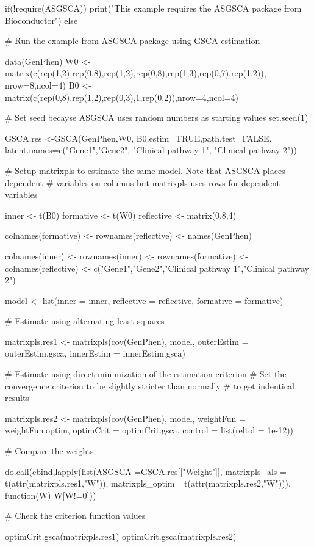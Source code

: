 \documentclass[a4paper]{book}
\begin{document}
%
\begin{Examples}
\begin{ExampleCode}
if(!require(ASGSCA)){
    print("This example requires the ASGSCA package from Bioconductor")
} else{
# Run the example from ASGSCA package using GSCA estimation

data(GenPhen)
W0 <- matrix(c(rep(1,2),rep(0,8),rep(1,2),rep(0,8),rep(1,3),rep(0,7),rep(1,2)),
             nrow=8,ncol=4)
B0 <- matrix(c(rep(0,8),rep(1,2),rep(0,3),1,rep(0,2)),nrow=4,ncol=4)

# Set seed becayse ASGSCA uses random numbers as starting values 
set.seed(1)

GSCA.res <-GSCA(GenPhen,W0, B0,estim=TRUE,path.test=FALSE, 
                 latent.names=c("Gene1","Gene2",
                                "Clinical pathway 1",
                                "Clinical pathway 2"))

# Setup matrixpls to estimate the same model. Note that ASGSCA places dependent
# variables on columns but matrixpls uses rows for dependent variables

inner <- t(B0)
formative <- t(W0)
reflective <- matrix(0,8,4)

colnames(formative) <- rownames(reflective) <- names(GenPhen)

colnames(inner) <- rownames(inner) <- 
  rownames(formative) <- colnames(reflective) <-
  c("Gene1","Gene2","Clinical pathway 1","Clinical pathway 2")

model <- list(inner = inner, 
              reflective = reflective,
              formative = formative)

# Estimate using alternating least squares

matrixpls.res1 <- matrixpls(cov(GenPhen),  model,
                            outerEstim = outerEstim.gsca,
                            innerEstim = innerEstim.gsca)

# Estimate using direct minimization of the estimation criterion
# Set the convergence criterion to be slightly stricter than normally
# to get indentical results

matrixpls.res2 <- matrixpls(cov(GenPhen),  model,
                            weightFun = weightFun.optim,
                            optimCrit = optimCrit.gsca,
                            control = list(reltol = 1e-12))

# Compare the weights

do.call(cbind,lapply(list(ASGSCA =GSCA.res[["Weight"]],
                          matrixpls_als = t(attr(matrixpls.res1,"W")),
                          matrixpls_optim =t(attr(matrixpls.res2,"W"))),
                     function(W) W[W!=0]))


# Check the criterion function values

optimCrit.gsca(matrixpls.res1)
optimCrit.gsca(matrixpls.res2)

}
\end{ExampleCode}
\end{Examples}
\end{document}
